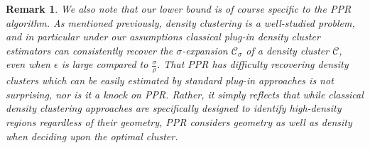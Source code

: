 \documentclass[11pt,twoside]{article}
\newtheorem*{remark}{Remark}
\newcommand{\1}{\mathbf{1}}
\newcommand{\Xbf}{X}             %
\newcommand{\Cset}{\mathcal{C}}
\newcommand{\Csig}{\Cset_{\sigma}}
\begin{document}

\begin{remark}
	We also note that our lower bound is of course specific to the PPR algorithm. As mentioned previously, density clustering is a well-studied problem, and in particular under our assumptions classical plug-in density cluster estimators can consistently recover the $\sigma$-expansion $\Csig$ of a density cluster $\Cset$, even when $\epsilon$ is large compared to $\frac{\sigma}{\rho}$. That PPR has difficulty recovering density clusters which can be easily estimated by standard plug-in approaches is not surprising, nor is it a knock on PPR. Rather, it simply reflects that while classical density clustering approaches are specifically designed to identify high-density regions regardless of their geometry, PPR considers geometry as well as density when deciding upon the optimal cluster.
\end{remark}
\end{document}
